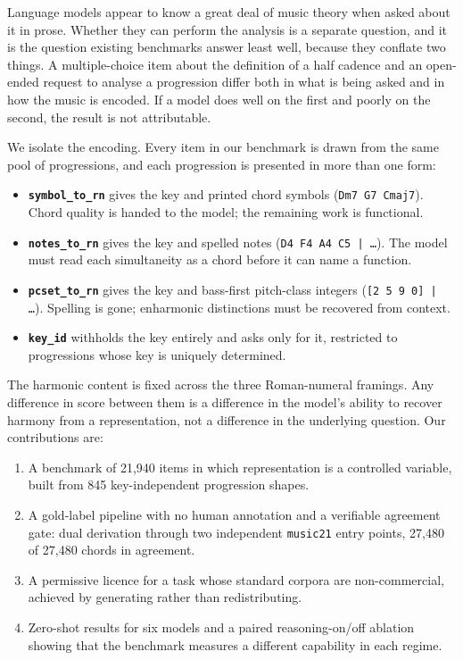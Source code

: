 \documentclass[11pt]{article}
\begin{document}
Language models appear to know a great deal of music theory when asked about it
in prose. Whether they can perform the analysis is a separate question, and it is
the question existing benchmarks answer least well, because they conflate two
things. A multiple-choice item about the definition of a half cadence and an
open-ended request to analyse a progression differ both in what is being asked
and in how the music is encoded. If a model does well on the first and poorly on
the second, the result is not attributable.

We isolate the encoding. Every item in our benchmark is drawn from the same pool
of progressions, and each progression is presented in more than one form:

\begin{itemize}
  \item \textbf{\texttt{symbol\_to\_rn}} gives the key and printed chord symbols
    (\texttt{Dm7 G7 Cmaj7}). Chord quality is handed to the model; the remaining
    work is functional.
  \item \textbf{\texttt{notes\_to\_rn}} gives the key and spelled notes
    (\texttt{D4 F4 A4 C5 | \dots}). The model must read each simultaneity as a
    chord before it can name a function.
  \item \textbf{\texttt{pcset\_to\_rn}} gives the key and bass-first pitch-class
    integers (\texttt{[2 5 9 0] | \dots}). Spelling is gone; enharmonic
    distinctions must be recovered from context.
  \item \textbf{\texttt{key\_id}} withholds the key entirely and asks only for it,
    restricted to progressions whose key is uniquely determined.
\end{itemize}

The harmonic content is fixed across the three Roman-numeral framings. Any
difference in score between them is a difference in the model's ability to
recover harmony from a representation, not a difference in the underlying
question. Our contributions are:

\begin{enumerate}
  \item A benchmark of 21{,}940 items in which representation is a controlled
    variable, built from 845 key-independent progression shapes.
  \item A gold-label pipeline with no human annotation and a verifiable
    agreement gate: dual derivation through two independent \texttt{music21}
    entry points, 27{,}480 of 27{,}480 chords in agreement.
  \item A permissive licence for a task whose standard corpora are
    non-commercial, achieved by generating rather than redistributing.
  \item Zero-shot results for six models and a paired reasoning-on/off ablation
    showing that the benchmark measures a different capability in each regime.
\end{enumerate}
\end{document}
